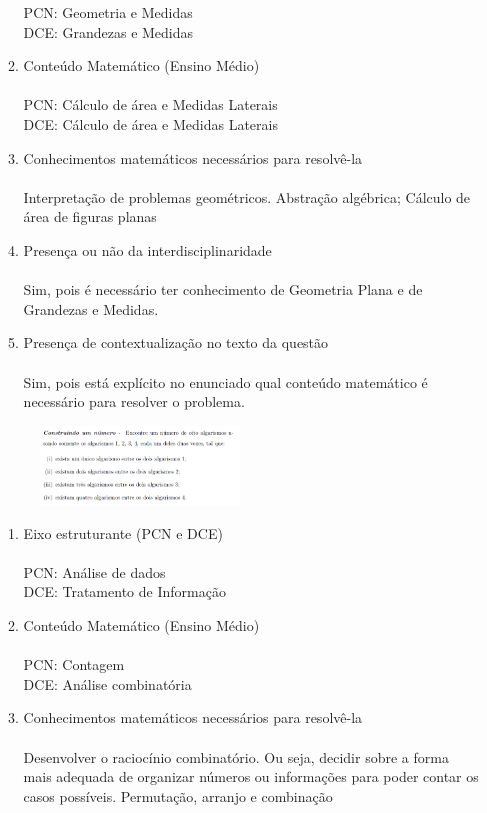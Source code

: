 \documentclass[a4paper, 12pt]{article}
\begin{document}
\begin{enumerate}
\begin{enumerate}
    PCN: Geometria e Medidas\\
    DCE: Grandezas e Medidas
  \item Conteúdo Matemático (Ensino Médio) \\\\
    PCN: Cálculo de área e Medidas Laterais \\
    DCE: Cálculo de área e Medidas Laterais
  \item Conhecimentos matemáticos necessários para resolvê-la \\\\
    Interpretação de problemas geométricos. Abstração algébrica; Cálculo de área de figuras planas    
  \item Presença ou não da interdisciplinaridade \\\\
    Sim, pois é necessário ter conhecimento de Geometria Plana e de Grandezas e Medidas.
  \item Presença de contextualização no texto da questão\\\\
    Sim, pois está explícito no enunciado qual conteúdo matemático é necessário para resolver o problema.
  \end{enumerate}
\begin{figure}[h!]
  \centering
  \includegraphics[width=0.5\textwidth]{4}
\end{figure} 
  \begin{enumerate}
  \item Eixo estruturante (PCN e DCE)\\\\
    PCN: Análise de dados \\
    DCE: Tratamento de Informação
  \item Conteúdo Matemático (Ensino Médio) \\\\
    PCN: Contagem\\
    DCE: Análise combinatória   
  \item Conhecimentos matemáticos necessários para resolvê-la \\\\
    Desenvolver o raciocínio combinatório. Ou seja, decidir sobre a forma mais adequada de organizar números ou informações para poder contar os casos possíveis. Permutação, arranjo e combinação

\end{enumerate}
\end{enumerate}
\end{document}
